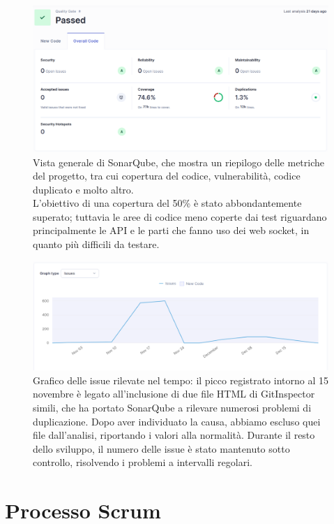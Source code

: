 \documentclass{article}
\begin{document}
\begin{figure}[H]
    \centering
    \includegraphics[width=1\textwidth]{report-sq_overview}
    \caption{Vista generale di SonarQube, che mostra un riepilogo delle metriche del progetto, tra cui copertura del codice, vulnerabilità, codice duplicato 
    e molto altro. \\
    L'obiettivo di una copertura del 50\% è stato abbondantemente superato; tuttavia le aree di codice meno coperte dai test riguardano principalmente le API 
    e le parti che fanno uso dei web socket, in quanto più difficili da testare.}
    \label{fig:sq_overview}
\end{figure}

\begin{figure}[H]
    \centering
    \includegraphics[width=1\textwidth]{report-sq_issues}
    \caption{Grafico delle issue rilevate nel tempo: il picco registrato intorno al 15 novembre è legato all'inclusione di due file HTML di GitInspector simili, 
    che ha portato SonarQube a rilevare numerosi problemi di duplicazione. Dopo aver individuato la causa, abbiamo escluso quei file dall'analisi, riportando 
    i valori alla normalità. Durante il resto dello sviluppo, il numero delle issue è stato mantenuto sotto controllo, risolvendo i problemi a intervalli regolari.}
    \label{fig:sq_issues}
\end{figure}


\section{Processo Scrum}
\end{document}
